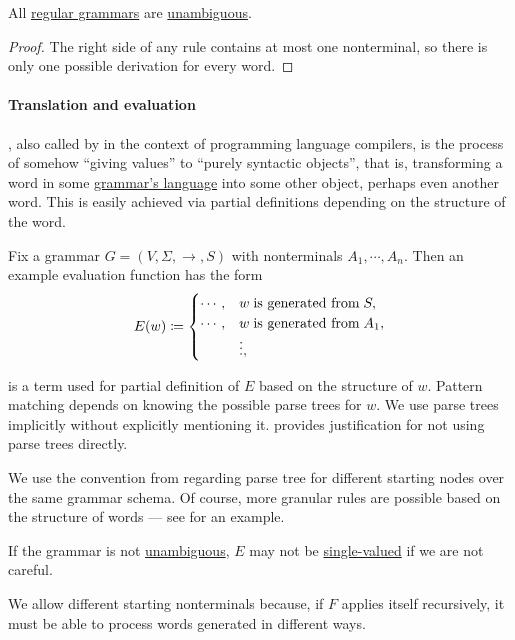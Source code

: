 \begin{proposition}\label{thm:regular_grammars_are_unambiguous}
  All \hyperref[def:chomsky_hierarchy/regular]{regular grammars} are \hyperref[def:grammar_ambiguity]{unambiguous}.
\end{proposition}
\begin{proof}
  The right side of any rule contains at most one nonterminal, so there is only one possible derivation for every word.
\end{proof}

\paragraph{Translation and evaluation}

\begin{remark}\label{rem:evaluation}
  , also called  by  in the context of programming language compilers, is the process of somehow \enquote{giving values} to \enquote{purely syntactic objects}, that is, transforming a word in some \hyperref[def:formal_grammar/language]{grammar's language} into some other object, perhaps even another word. This is easily achieved via partial definitions depending on the structure of the word.

  Fix a grammar \( G = (V, \Sigma, \to, S) \) with nonterminals \( A_1, \cdots, A_n \). Then an example evaluation function has the form
  \begin{equation*}
    E(w) \coloneqq \begin{cases}
      \cdots, &w \T{is generated from} S, \\
      \cdots, &w \T{is generated from} A_1, \\
              &\vdots,
    \end{cases}
  \end{equation*}

   is a term used for partial definition of \( E \) based on the structure of \( w \). Pattern matching depends on knowing the possible parse trees for \( w \). We use parse trees implicitly without explicitly mentioning it.  provides justification for not using parse trees directly.

  We use the convention from  regarding parse tree for different starting nodes over the same grammar schema. Of course, more granular rules are possible based on the structure of words --- see  for an example.
\end{remark}
\begin{comments}
  \item If the grammar is not \hyperref[def:grammar_ambiguity]{unambiguous}, \( E \) may not be \hyperref[def:function]{single-valued} if we are not careful.
  \item We allow different starting nonterminals because, if \( F \) applies itself recursively, it must be able to process words generated in different ways.
\end{comments}

